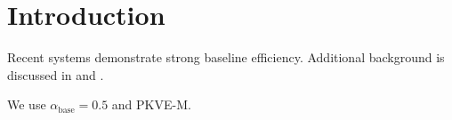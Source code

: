 \section{Introduction}\label{sec:intro}

Recent systems \citep{kwon2023vllm} demonstrate strong baseline efficiency. Additional background is discussed in \citep{xiao2024streaming} and \citep{chen2025phantomkv}.

We use $\alpha_{\text{base}} = 0.5$ and PKVE-M.
